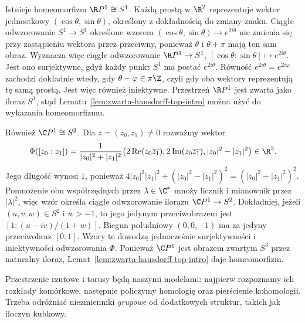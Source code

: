 \begin{przyklad}
\label{prz:rzutowe-wymiar-jeden-top-intro}
Istnieje homeomorfizm $\R P^1\cong S^1$.
Każdą prostą w $\R^2$ reprezentuje
wektor jednostkowy $(\cos\theta,\sin\theta)$,
określony z dokładnością do zmiany znaku.
Ciągłe odwzorowanie $S^1\to S^1$ określone wzorem
$(\cos\theta,\sin\theta)\mapsto e^{2i\theta}$
nie zmienia się przy zastąpieniu wektora przez przeciwny,
ponieważ $\theta$ i $\theta+\pi$ mają ten sam obraz.
Wyznacza więc ciągłe odwzorowanie
$\R P^1\to S^1$, $[\cos\theta:\sin\theta]\mapsto e^{2i\theta}$.
Jest ono surjektywne, gdyż każdy punkt $S^1$ ma postać
$e^{2i\theta}$. Równość $e^{2i\theta}=e^{2i\varphi}$
zachodzi dokładnie wtedy, gdy $\theta-\varphi\in\pi\Z$,
czyli gdy oba wektory reprezentują tę samą prostą.
Jest więc również iniektywne.
Przestrzeń $\R P^1$ jest zwarta jako iloraz $S^1$,
stąd Lematu~\ref{lem:zwarta-hausdorff-top-intro}
można użyć do wykazania homeomorfizmu.

Również $\C P^1\cong S^2$. Dla $z=(z_0,z_1)\ne0$
rozważmy wektor
\[
\Phi([z_0:z_1])=
\frac{1}{|z_0|^2+|z_1|^2}
\bigl(2\operatorname{Re}(z_0\overline{z_1}),
      2\operatorname{Im}(z_0\overline{z_1}),
      |z_0|^2-|z_1|^2\bigr)\in\R^3.
\]
Jego długość wynosi $1$, ponieważ
$4|z_0|^2|z_1|^2+(|z_0|^2-|z_1|^2)^2
=(|z_0|^2+|z_1|^2)^2$.
Pomnożenie obu współrzędnych przez
$\lambda\in\C^*$ mnoży licznik i mianownik
przez $|\lambda|^2$, więc wzór określa
ciągłe odwzorowanie ilorazu $\C P^1\to S^2$.
Dokładniej, jeżeli $(u,v,w)\in S^2$ i $w>-1$,
to jego jedynym przeciwobrazem jest
$[1:(u-iv)/(1+w)]$. Biegun południowy $(0,0,-1)$
ma za jedyny przeciwobraz $[0:1]$.
Wzory te dowodzą jednocześnie surjektywności
i iniektywności odwzorowania $\Phi$.
Ponieważ $\C P^1$ jest obrazem zwartym $S^3$
przez naturalny iloraz, Lemat~\ref{lem:zwarta-hausdorff-top-intro} daje homeomorfizm.
\end{przyklad}

\begin{uwaga}
Przestrzenie rzutowe i torusy będą naszymi modelami:
najpierw rozpoznamy ich rozkłady komórkowe,
następnie policzymy homologię oraz pierścienie
kohomologii. Trzeba odróżniać niezmienniki
\emph{grupowe} od dodatkowych struktur,
takich jak iloczyn kubkowy.
\end{uwaga}

